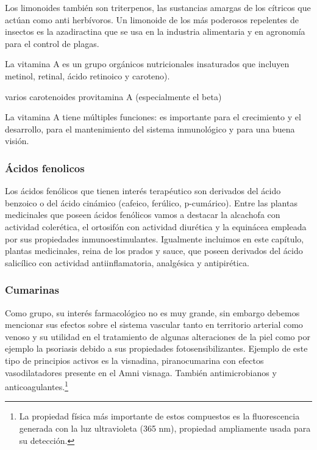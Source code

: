 Los limonoides también son triterpenos, las sustancias amargas de los cítricos que actúan como anti herbívoros. Un limonoide de los más poderosos repelentes de insectos es la azadiractina que se usa en la industria alimentaria y en agronomía para el control de plagas.

La vitamina A es un grupo orgánicos nutricionales insaturados que incluyen metinol, retinal, ácido retinoico y caroteno).

varios carotenoides provitamina A (especialmente el beta)

La vitamina A tiene múltiples funciones: es importante para el crecimiento y el desarrollo, para el mantenimiento del sistema inmunológico y para una buena visión.

\subsubsection{Ácidos fenolicos}
Los ácidos fenólicos que tienen interés terapéutico son derivados del ácido benzoico o del ácido cinámico (cafeico, ferúlico, p-cumárico). Entre las plantas medicinales que poseen ácidos fenólicos vamos a destacar la alcachofa con actividad colerética, el ortosifón con actividad diurética y la equinácea empleada por sus propiedades inmunoestimulantes. Igualmente incluimos en este capítulo, plantas medicinales, reina de los prados y sauce, que poseen derivados del ácido salicílico con actividad antiinflamatoria, analgésica y antipirética.

\subsubsection{Cumarinas}
Como grupo, su interés farmacológico no es muy grande, sin embargo debemos mencionar sus efectos sobre el sistema vascular tanto en territorio arterial como venoso y su utilidad en el tratamiento de algunas alteraciones de la piel como por ejemplo la psoriasis debido a sus propiedades fotosensibilizantes. Ejemplo de este tipo de principios activos es la visnadina, piranocumarina con efectos vasodilatadores presente en el Amni visnaga. También antimicrobianos y anticoagulantes.\footnote{La propiedad física más importante de estos compuestos es la fluorescencia generada con la luz ultravioleta (365 nm), propiedad ampliamente usada para su detección.}

